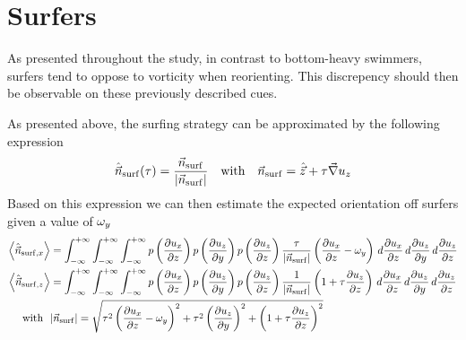 \section{Surfers}

As presented throughout the study, in contrast to bottom-heavy swimmers, surfers tend to oppose to vorticity when reorienting.
This discrepency should then be observable on these previously described cues.

As presented above, the surfing strategy can be approximated by the following expression
\begin{equation}
	\hat{\vec{n}}_{\mathrm{surf}}(\tau) = \frac{\vec{n}_{\mathrm{surf}}}{\lvert\vec{n}_{\mathrm{surf}}\rvert} \quad \text{with} \quad \vec{n}_{\mathrm{surf}} = \hat{\vec{z}} + \tau \vec{\nabla} u_z
\end{equation}
Based on this expression we can then estimate the expected orientation off surfers given a value of $\omega_y$
\begin{subequations}
	\begin{align}
		\left\langle \hat{\vec{n}}_{\mathrm{surf}, x} \right\rangle &= \int_{-\infty}^{+\infty} \int_{-\infty}^{+\infty} \int_{-\infty}^{+\infty} p \left(\frac{\partial u_x}{\partial z} \right) p \left( \frac{\partial u_z}{\partial y} \right) p \left( \frac{\partial u_z}{\partial z} \right) \frac{\tau}{\lvert\vec{n}_{\mathrm{surf}}\rvert} \left( \frac{\partial u_x}{\partial z} - \omega_y \right) \, d\frac{\partial u_x}{\partial z} \, d\frac{\partial u_z}{\partial y} \, d\frac{\partial u_z}{\partial z}\\
		\left\langle \hat{\vec{n}}_{\mathrm{surf}, z} \right\rangle &= \int_{-\infty}^{+\infty} \int_{-\infty}^{+\infty} \int_{-\infty}^{+\infty} p \left(\frac{\partial u_x}{\partial z} \right) p \left( \frac{\partial u_z}{\partial y} \right) p \left( \frac{\partial u_z}{\partial z} \right) \frac{1}{\lvert\vec{n}_{\mathrm{surf}}\rvert} \left( 1 + \tau \frac{\partial u_z}{\partial z} \right) \, d\frac{\partial u_x}{\partial z} \, d\frac{\partial u_z}{\partial y} \, d\frac{\partial u_z}{\partial z}\\
		\text{with} ~~ &\lvert\vec{n}_{\mathrm{surf}}\rvert = \sqrt{\tau^2 \left( \frac{\partial u_x}{\partial z} - \omega_y \right)^2 + \tau^2 \left( \frac{\partial u_z}{\partial y} \right)^2 + \left(1 + \tau \frac{\partial u_z}{\partial z}\right)^2}
	\end{align}
\end{subequations}
